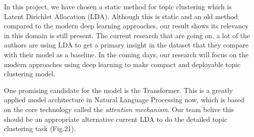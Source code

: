 In this project, we have chosen a static method for topic clustering which is
Latent Dirichlet Allocation (LDA). Although this is static and an old method
compared to the modern deep learning approaches, our result shows its
relevancy in this domain is still present. The current research that are
going on, a lot of the authors are using LDA to get a primary insight in the
dataset that they compare with their model as a baseline. In the coming days,
our research will focus on the modern approaches using deep learning to make
compact and deployable topic clustering model.

One promising candidate for the model is the Transformer. This is a greatly
applied model architecture in Natural Language Processing now, which is based
on the core technology called the \textit{attention mechanism}. Our team
belive this should be an appropriate alternative current LDA to do the
detailed topic clustering task (Fig.21). 
